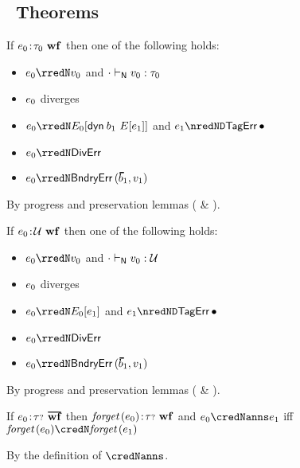 \subsection{\Nname{}\ Theorems}

\begin{theorem}\label{H-S-type-soundness}
  If\/ $e_0\!:\!\tau_0~\mathbf{wf}$
  then one of the following holds:
  \begin{itemize}
    \item $ \sexpr_0 \rredN \svalue_0$ and\/ ${\cdot} \vdash_{\mathsf{N}} v_0 : \tau_0$
    \item $ e_0$ diverges
    \item $ \sexpr_0 \rredN
      \ctx_0[\edynb{\sbnd_1}{\ctx[\sexpr_1]}]$
      and\/ $\sexpr_1 \nredND \tagerrorD$
    \item $ \sexpr_0 \rredN \divisionbyzeroerror$
    \item $ \sexpr_0 \rredN \boundaryerror{\sblist_1}{\svalue_1}$
  \end{itemize}
\end{theorem}
\begin{lamportproof}
  By progress and preservation lemmas ( \& ).
\end{lamportproof}

\begin{theorem}\label{H-D-type-soundness}
  If\/ $e_0\!:\!{\mathcal U}~\mathbf{wf}$
  then one of the following holds:
  \begin{itemize}
    \item $\sexpr_0 \rredN \svalue_0$ and\/ ${\cdot} \vdash_{\mathsf{N}} v_0 : {\mathcal U}$
    \item $e_0$ diverges
    \item $\sexpr_0 \rredN \ctx_0[\sexpr_1]$
      and\/ $\sexpr_1 \nredND \tagerrorD$
    \item $\sexpr_0 \rredN \divisionbyzeroerror$
    \item $\sexpr_0 \rredN \boundaryerror{\sblist_1}{\svalue_1}$
  \end{itemize}
\end{theorem}
\begin{lamportproof}
  By progress and preservation lemmas ( \& ).
\end{lamportproof}

\begin{theorem}\label{H-sync}
  If\/ $\fwellformedO{\sexpr_0}{\stoptional}$
  then\/ $\textit{forget}\,(e_0)\!:\!{\tau{\scriptstyle ?}}~\mathbf{wf}$
  and\/ $\sexpr_0 \credNanns \sexpr_1$
  iff\/ $\fforget{\sexpr_0} \credN \fforget{\sexpr_1}$
\end{theorem}
\begin{lamportproof}
  By the definition of $\credNanns$.
\end{lamportproof}

